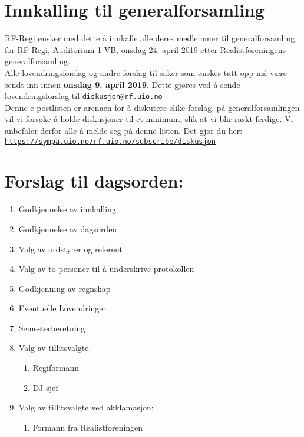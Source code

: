 \documentclass[a4paper]{article}
\begin{document}
\section*{\textsf{\textbf{\huge Innkalling til generalforsamling}}}
\vspace{1cm}

RF-Regi ønsker med dette å innkalle alle deres medlemmer til generalforsamling
for RF-Regi, Auditorium 1 VB, onsdag 24. april 2019 etter
    Realistforeningens generalforsamling. \\

Alle lovendringsforslag og andre forslag til saker som ønskes tatt opp må
være sendt inn innen \textbf{onsdag 9. april 2019}. Dette gjøres ved å sende
lov\-endringsforslag til
\href{mailto:diskusjon@rf.uio.no}{\texttt{diskusjon@rf.uio.no}} \\

Denne e-postlisten er arenaen for å diskutere slike forslag, på general\-forsamlingen vil vi
forsøke å holde diskusjoner til et minimum, slik at vi blir raskt ferdige.
Vi anbefaler derfor alle å melde seg på denne listen. Det gjør du her:\\
\texttt{\url{https://sympa.uio.no/rf.uio.no/subscribe/diskusjon}}\\

\section*{\textsf{Forslag til dagsorden:}}
\begin{enumerate}
    \item Godkjennelse av innkalling
    \item Godkjennelse av dagsorden
    \item Valg av ordstyrer og referent
    \item Valg av to personer til å underskrive protokollen
    \item Godkjenning av regnskap
    \item Eventuelle Lovendringer
    \item Semesterberetning
    \item Valg av tillitsvalgte:
    \begin{enumerate}
        \item Regiformann
        \item DJ-sjef
    \end{enumerate}
    \item Valg av tillitsvalgte ved akklamasjon:
    \begin{enumerate}
        \item Formann fra Realistforeningen
    \end{enumerate}
\end{enumerate}
\end{document}
